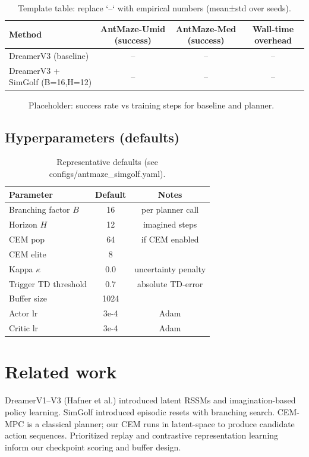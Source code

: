 \documentclass{article}
\begin{document}
\begin{table}[ht]
\centering
\begin{tabular}{lccc}
\toprule
Method & AntMaze-Umid (success) & AntMaze-Med (success) & Wall-time overhead \\
\midrule
DreamerV3 (baseline) & -- & -- & -- \\
DreamerV3 + SimGolf (B=16,H=12) & -- & -- & -- \\
\bottomrule
\end{tabular}
\caption{Template table: replace `--` with empirical numbers (mean±std over seeds).}
\end{table}

\begin{figure}[ht]
\centering
\caption{Placeholder: success rate vs training steps for baseline and planner.}
\end{figure}


\subsection{Hyperparameters (defaults)}
\begin{table}[ht]
\centering
\begin{tabular}{lcc}
\toprule
Parameter & Default & Notes \\
\midrule
Branching factor \(B\) & 16 & per planner call \\
Horizon \(H\) & 12 & imagined steps \\
CEM pop & 64 & if CEM enabled \\
CEM elite & 8 & \\
Kappa \(\kappa\) & 0.0 & uncertainty penalty \\
Trigger TD threshold & 0.7 & absolute TD-error \\
Buffer size & 1024 & \\
Actor lr & 3e-4 & Adam \\
Critic lr & 3e-4 & Adam \\
\bottomrule
\end{tabular}
\caption{Representative defaults (see configs/antmaze_simgolf.yaml).}
\end{table}

\section{Related work}
DreamerV1--V3 (Hafner et al.) introduced latent RSSMs and imagination-based policy
learning. SimGolf introduced episodic resets with branching search. CEM-MPC is a
classical planner; our CEM runs in latent-space to produce candidate action
sequences. Prioritized replay and contrastive representation learning inform our
checkpoint scoring and buffer design.
\end{document}
